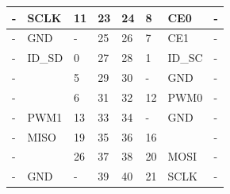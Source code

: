 \begin{table}[h]
\begin{tabular}{|l|l|l|l|l|l|l|l|}
-                 & SCLK           & 11           & 23           & 24           & 8            & CE0            & -                  \\ \hline
-                 & GND            & -            & 25           & 26           & 7            & CE1            & -                  \\ \hline
-                 & ID\_SD         & 0            & 27           & 28           & 1            & ID\_SC         & -                 \\ \hline
-                 &                & 5            & 29           & 30           & -            & GND            & -                 \\ \hline
-                 &                & 6            & 31           & 32           & 12           & PWM0           & -                 \\ \hline
-                 & PWM1           & 13           & 33           & 34           & -            & GND            & -                 \\ \hline
-                 & MISO           & 19           & 35           & 36           & 16           &                & -                  \\ \hline
-                 &                & 26           & 37           & 38           & 20           & MOSI           & -                  \\ \hline
-                 & GND            & -            & 39           & 40           & 21           & SCLK           & -                 \\ \hline
\end{tabular}
\end{table}


